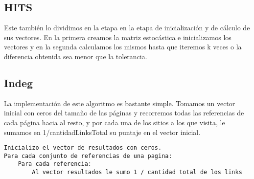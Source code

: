 \subsection{HITS}
Este también lo dividimos en la etapa en la etapa de inicialización y de cálculo de sus vectores. En la primera creamos la matriz estocástica e inicializamos los vectores y en la segunda calculamos los mismos hasta que iteremos k veces o la diferencia obtenida sea menor que la tolerancia.

%	
	

\subsection{Indeg}

La implementación de este algoritmo es bastante simple. Tomamos un vector inicial con ceros del tamaño de las páginas y recorremos todas las referencias de cada página hacia al resto, y por cada una de los sitios a los que visita, le sumamos en 1/cantidadLinksTotal su puntaje en el vector inicial.

\begin{lstlisting}[frame=single] 
Inicializo el vector de resultados con ceros.
Para cada conjunto de referencias de una pagina:
	Para cada referencia:
		Al vector resultados le sumo 1 / cantidad total de los links
	
\end{lstlisting}
